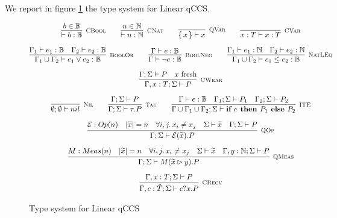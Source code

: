 We report in figure \ref{typesystem} the type system for Linear qCCS.


\begin{figure}[h!]
\caption{Type system for Linear qCCS}
\label{typesystem}
\begin{gather*}
\infer[\mbox{\footnotesize\scshape CBool}]{\vdash b : \mathbb{B}}{b \in \mathbb{B}} \qquad
\infer[\mbox{\footnotesize\scshape CNat}]{\vdash n : \mathbb{N}}{n \in \mathbb{N}} \qquad
\infer[\mbox{\footnotesize\scshape QVar}]{\set{x} \vdash x}{} \qquad
\infer[\mbox{\footnotesize\scshape CVar}]{x : T \vdash x : T}{} \\[0.2cm]
\infer[\mbox{\footnotesize\scshape BoolOr}]{\Gamma_1 \cup \Gamma_2 \vdash e_1 \lor e_2 : \mathbb{B}}{\Gamma_1 \vdash e_1 : \mathbb{B} & \Gamma_2 \vdash e_2 : \mathbb{B}} \qquad
\infer[\mbox{\footnotesize\scshape BoolNeg}]{\Gamma \vdash \neg e : \mathbb{B}}{\Gamma \vdash e : \mathbb{B}} \qquad
\infer[\mbox{\footnotesize\scshape NatLEq}]{\Gamma_1 \cup \Gamma_2 \vdash e_1 \leq e_2 : \mathbb{B}}{\Gamma_1 \vdash e_1 : \mathbb{N} & \Gamma_2 \vdash e_2 : \mathbb{N}} \\[0.2cm]
 \infer[\mbox{\footnotesize\scshape CWeak}]{\Gamma, x : T; \Sigma \vdash P}{\Gamma; \Sigma \vdash P & \text{$x$ fresh}} \\[0.2cm]
\infer[\mbox{\footnotesize\scshape Nil}]{\emptyset; \emptyset \vdash nil}{} \qquad
\infer[\mbox{\footnotesize\scshape Tau}]{\Gamma; \Sigma \vdash \tau . P}{ \Gamma; \Sigma \vdash P} \qquad
\infer[\mbox{\footnotesize\scshape ITE}]{\Gamma \cup \Gamma_1 \cup \Gamma_2; \Sigma \vdash \ite{e}{P_1}{P_2}}{\Gamma \vdash e : \mathbb{B} & \Gamma_1; \Sigma \vdash P_1 & \Gamma_2; \Sigma \vdash P_2} \\[0.2cm]
\infer[\mbox{\footnotesize\scshape QOp}]
{\Gamma; \Sigma \vdash \mathcal{E}(\widetilde{x}) . P}
{\mathcal{E}: Op(n) & |\widetilde{x}| = n & \forall i, j \ldotp x_i \neq x_j & \Sigma \vdash \widetilde{x} & \Gamma; \Sigma \vdash P} \\[0.2cm]
\infer[\mbox{\footnotesize\scshape QMeas}]{\Gamma; \Sigma \vdash M(\widetilde{x} \rhd y) . P}
{M: Meas(n) & |\widetilde{x}| = n &  \forall i, j \ldotp x_i \neq x_j  & \Sigma \vdash \widetilde{x} & \Gamma, y : \mathbb{N}; \Sigma \vdash P} \\[0.2cm]
\infer[\mbox{\footnotesize\scshape CRecv}]
{\Gamma, c : \hat{T}; \Sigma \vdash c?x . P}
{\Gamma, x : T; \Sigma \vdash P} 

\end{gather*}
\end{figure}
